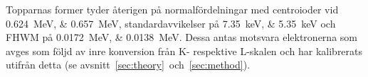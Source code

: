 Topparnas former tyder återigen på normalfördelningar med centroioder vid
\qtylist{0.624;0.657}{\MeV}, standardavvikelser på
\qtylist{7.35;5.35}{\kilo\eV} och FHWM på \qtylist{0.0172;0.0138}{\MeV}.
Dessa antas motsvara elektronerna som avges som följd av inre konversion från
K- respektive L-skalen och har kalibrerats utifrån detta (se
avsnitt~\ref{sec:theory}~och~\ref{sec:method}).
